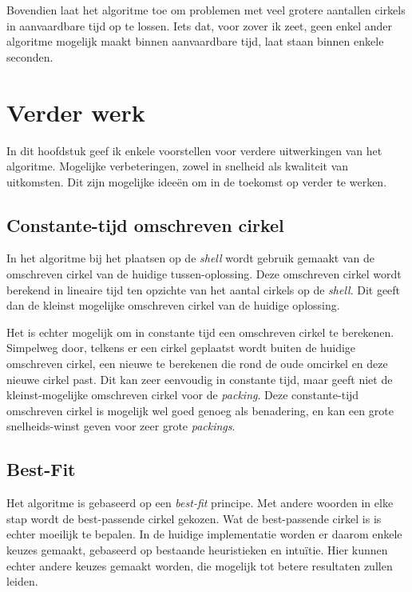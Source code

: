 \documentclass[12pt,a4paper,oneside]{book}
\begin{document}
{Bovendien laat het algoritme toe om problemen met veel grotere aantallen cirkels in aanvaardbare tijd op te lossen.
Iets dat, voor zover ik zeet, geen enkel ander algoritme mogelijk maakt binnen aanvaardbare tijd, laat staan binnen enkele seconden.

\chapter{Verder werk} \label{chap:verder-werk}

In dit hoofdstuk geef ik enkele voorstellen voor verdere uitwerkingen van het algoritme.
Mogelijke verbeteringen, zowel in snelheid als kwaliteit van uitkomsten.
Dit zijn mogelijke ideeën om in de toekomst op verder te werken.

\section{Constante-tijd omschreven cirkel}

In het algoritme bij het plaatsen op de \textit{shell} wordt gebruik gemaakt van de omschreven cirkel van de huidige tussen-oplossing.
Deze omschreven cirkel wordt berekend in lineaire tijd ten opzichte van het aantal cirkels op de \textit{shell}.
Dit geeft dan de kleinst mogelijke omschreven cirkel van de huidige oplossing.

Het is echter mogelijk om in constante tijd een omschreven cirkel te berekenen.
Simpelweg door, telkens er een cirkel geplaatst wordt buiten de huidige omschreven cirkel, een nieuwe te berekenen die rond de oude omcirkel en deze nieuwe cirkel past.
Dit kan zeer eenvoudig in constante tijd, maar geeft niet de kleinst-mogelijke omschreven cirkel voor de \textit{packing}.
Deze constante-tijd omschreven cirkel is mogelijk wel goed genoeg als benadering, en kan een grote snelheids-winst geven voor zeer grote \textit{packings}.

\section{Best-Fit}

Het algoritme is gebaseerd op een \textit{best-fit} principe.
Met andere woorden in elke stap wordt de best-passende cirkel gekozen.
Wat de best-passende cirkel is is echter moeilijk te bepalen.
In de huidige implementatie worden er daarom enkele keuzes gemaakt, gebaseerd op bestaande heuristieken en intuïtie.
Hier kunnen echter andere keuzes gemaakt worden, die mogelijk tot betere resultaten zullen leiden.

}
\end{document}
